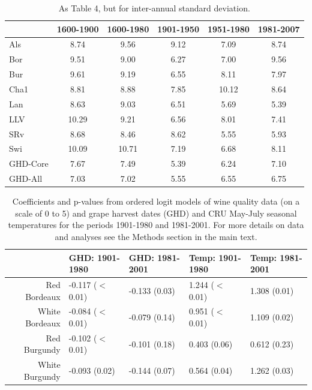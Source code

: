 \documentclass[12pt]{article}
\begin{document}
\begin{table}
\small
\caption{\small As Table 4, but for inter-annual standard deviation.}
\centering
\begin{tabular}{l c c c c c}
\hline
& \bf 1600-1900 & \bf 1600-1980 & \bf 1901-1950 & \bf 1951-1980 & \bf 1981-2007\\
\hline
Als	& 8.74	& 9.56	& 9.12	& 7.09	& 8.74\\
Bor	& 9.51	& 9.00	& 6.27	& 7.00	& 9.56\\
Bur	& 9.61 & 9.19 & 6.55 & 8.11 & 7.97\\
Cha1 & 8.81 & 8.88 & 7.85 & 10.12 & 8.64\\
Lan & 8.63 & 9.03 & 6.51 & 5.69 & 5.39\\
LLV	& 10.29 & 9.21 & 6.56 & 8.01 & 7.41\\
SRv & 8.68 & 8.46 & 8.62 & 5.55 & 5.93\\
Swi	& 10.09	& 10.71	& 7.19	& 6.68	& 8.11\\
\hline
GHD-Core & 7.67 & 7.49 & 5.39 & 6.24 & 7.10\\
GHD-All	& 7.03 & 7.02 & 5.55 & 6.55 & 6.75\\
\hline
\end{tabular}
\end{table}

\begin{table}
\centering
\caption{Coefficients and p-values from ordered logit models of wine quality data (on a scale of 0 to 5) and grape harvest dates (GHD) and CRU May-July seasonal temperatures for the periods 1901-1980 and 1981-2001. For more details on data and analyses see the Methods section in the main text.} 
\begin{tabular}{|r||l|l||l|l|}
  \hline
 & GHD: 1901-1980 & GHD: 1981-2001 & Temp: 1901-1980 & Temp: 1981-2001 \\ 
  \hline
Red Bordeaux & -0.117 ($<$0.01) & -0.133 (0.03) & 1.244 ($<$0.01) & 1.308 (0.01) \\ 
  White Bordeaux & -0.084 ($<$0.01) & -0.079 (0.14) & 0.951 ($<$0.01) & 1.109 (0.02) \\ 
  Red Burgundy & -0.102 ($<$0.01) & -0.101 (0.18) & 0.403 (0.06) & 0.612 (0.23) \\ 
  White Burgundy & -0.093 (0.02) & -0.144 (0.07) & 0.564 (0.04) & 1.262 (0.03) \\ 
   \hline
\end{tabular}
\end{table}%
\end{document}
